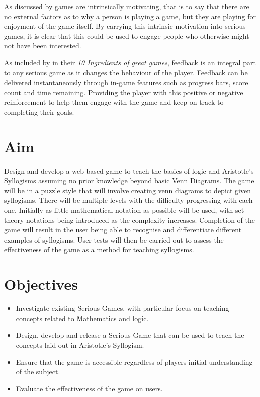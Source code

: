 \documentclass[12pt,a4paper]{report}
\begin{document}
As discussed by \cite{malone1981toward} games are intrinsically motivating, that is to say that there are no external factors as to why a person is playing a game, but they are playing for enjoyment of the game itself. By carrying this intrinsic motivation into serious games, it is clear that this could be used to engage people who otherwise might not have been interested. 

As included by \cite{reeves2013total} in their \textit{10 Ingredients of great games}, feedback is an integral part to any serious game as it changes the behaviour of the player. Feedback can be delivered instantaneously through in-game features such as progress bars, score count and time remaining. Providing the player with this positive or negative reinforcement to help them engage with the game and keep on track to completing their goals. 

\section{Aim}
Design and develop a web based game to teach the basics of logic and Aristotle's Syllogisms assuming no prior knowledge beyond basic Venn Diagrams. The game will be in a puzzle style that will involve creating venn diagrams to depict given syllogisms. There will be multiple levels with the difficulty progressing with each one. Initially as little mathematical notation as possible will be used, with set theory notations being introduced as the complexity increases. Completion of the game will result in the user being able to recognise and differentiate different examples of syllogisms. User tests will then be carried out to assess the effectiveness of the game as a method for teaching syllogisms. 
\section{Objectives}
\begin{itemize}
  \item Investigate existing Serious Games, with particular focus on teaching concepts related to Mathematics and logic.

  \item Design, develop and release a Serious Game that can be used to teach the concepts laid out in Aristotle's Syllogism.
  \item Ensure that the game is accessible regardless of players initial understanding of the subject.
  \item Evaluate the effectiveness of the game on users.
  
\end{itemize}
\end{document}
